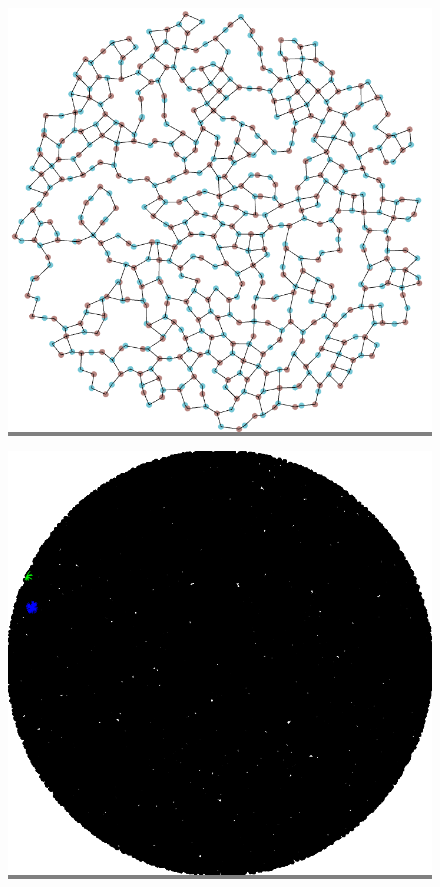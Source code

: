 \documentclass{article}
\begin{document}
\begin{figure}
\begin{minipage}{0.3\textwidth}
    \end{minipage}
    \hspace{\fill}
    \begin{minipage}{0.3\textwidth}
    \colorbox{gray}{\includegraphics[width=\linewidth]{./images/disk_0_bb_1.png}}
    \end{minipage}
    \vskip 0.1in
    \begin{minipage}{0.3\textwidth}
    \colorbox{gray}{\includegraphics[width=\linewidth]{./images/disk_1.png}}

\end{minipage}
\end{figure}
\end{document}
